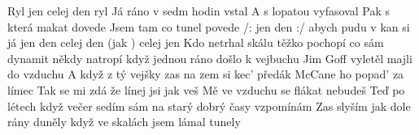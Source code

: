 \begin{TEXT}{Ryl jen celej den ryl}
\SLOKA Já  ráno v sedm hodin vstal \NL
A  s lopatou vyfasoval \NL
Pak s  která makat dovede \NL
Jsem  tam co tunel povede 
\REFREN  {} /:  jen  den  :/ \NL
abych      pudu  \NL
{} v kan  si  \NL
já  jen  den  \NL
celej den  (jak ) celej  jen  
\SLOKA Kdo netrhal skálu těžko pochopí \NL
co sám dynamit někdy natropí \NL
když jednou ráno došlo k vejbuchu \NL
Jim Goff vyletěl majli do vzduchu 
\SLOKA A když z tý vejšky zas na zem si kec' \NL
předák McCane ho popad' za límec \NL
Tak se mi zdá že línej jsi jak veš \NL
Mě ve vzduchu se flákat nebudeš 
\SLOKA Teď po létech když večer sedím sám \NL
na starý dobrý časy vzpomínám \NL
Zas slyším jak dole rány duněly \NL
když ve skalách jsem lámal tunely
\end{TEXT}
